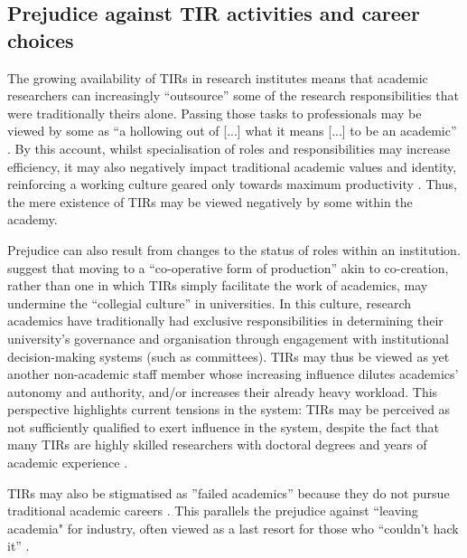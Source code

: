 \documentclass[authordate,meta,issue]{jote-new-article}
\begin{document}
\subsection{Prejudice against TIR activities and career choices}



The growing availability of TIRs in research institutes means that academic researchers can increasingly “outsource” some of the research responsibilities that were traditionally theirs alone. Passing those tasks to professionals may be viewed by some as “a hollowing out of [...] what it means [...] to be an academic” \parencites[71]{Macfarlane2011}. By this account, whilst specialisation of roles and responsibilities may increase efficiency, it may also negatively impact traditional academic values and identity, reinforcing a working culture geared only towards maximum productivity \parencites{Beatson2021}{Limas2022}{WellcomeTrust2020}. Thus, the mere existence of TIRs may be viewed negatively by some within the academy.







Prejudice can also result from changes to the status of roles within an institution. \textcites{Harloe2005} suggest that moving to a “co-operative form of production” akin to co-creation, rather than one in which TIRs simply facilitate the work of academics, may undermine the “collegial culture” in universities. In this culture, research academics have traditionally had exclusive responsibilities in determining their university's governance and organisation through engagement with institutional decision-making systems (such as committees). TIRs may thus be viewed as yet another non-academic staff member whose increasing influence dilutes academics' autonomy and authority, and/or increases their already heavy workload. This perspective highlights current tensions in the system: TIRs may be perceived as not sufficiently qualified to exert influence in the system, despite the fact that many TIRs are highly skilled researchers with doctoral degrees and years of academic experience \parencites{Teperek2022}{UKRI-ResearchEngland2022}.







TIRs may also be stigmatised as ”failed academics” because they do not pursue traditional academic careers \parencites{ARMA2020}{Gouldpraag2022}{Sever2017}. This parallels the prejudice against “leaving academia" for industry, often viewed as a last resort for those who “couldn't hack it” \parencites{Gewin2022}.
\end{document}
